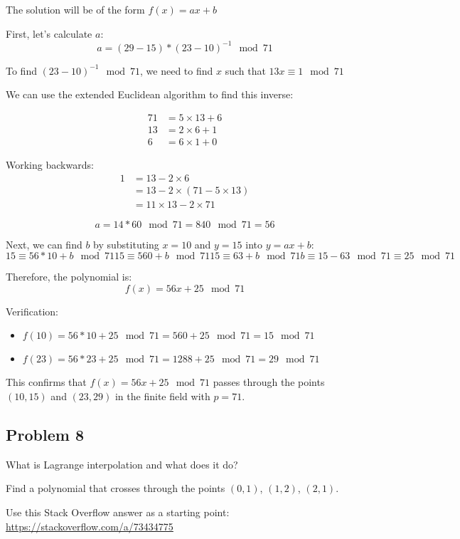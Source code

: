 \documentclass{article}
\begin{document}
The solution will be of the form $f(x) = ax + b$

First, let's calculate $a$:
\[
a = (29-15) * (23-10)^{-1} \mod 71
\]

To find $(23-10)^{-1} \mod 71$, we need to find $x$ such that $13x \equiv 1 \mod 71$

We can use the extended Euclidean algorithm to find this inverse:

\begin{align*}
71 &= 5 \times 13 + 6 \\
13 &= 2 \times 6 + 1 \\
6 &= 6 \times 1 + 0
\end{align*}

Working backwards:
\begin{align*}
1 &= 13 - 2 \times 6 \\
  &= 13 - 2 \times (71 - 5 \times 13) \\
  &= 11 \times 13 - 2 \times 71
\end{align*}

\[
a = 14 * 60 \mod 71 = 840 \mod 71 = 56
\]

Next, we can find $b$ by substituting $x=10$ and $y=15$ into $y = ax + b$:
\[
15 \equiv 56 * 10 + b \mod 71
15 \equiv 560 + b \mod 71
15 \equiv 63 + b \mod 71
b \equiv 15 - 63 \mod 71 \equiv 25 \mod 71
\]

Therefore, the polynomial is:
\[
f(x) = 56x + 25 \mod 71
\]

Verification:
\begin{itemize}
    \item $f(10) = 56 * 10 + 25 \mod 71 = 560 + 25 \mod 71 = 15 \mod 71$
    \item $f(23) = 56 * 23 + 25 \mod 71 = 1288 + 25 \mod 71 = 29 \mod 71$
\end{itemize}

This confirms that $f(x) = 56x + 25 \mod 71$ passes through the points $(10, 15)$ and $(23, 29)$ in the finite field with $p=71$.

\subsection*{Problem 8}
What is Lagrange interpolation and what does it do?

Find a polynomial that crosses through the points $(0, 1)$, $(1, 2)$, $(2, 1)$.

Use this Stack Overflow answer as a starting point: \url{https://stackoverflow.com/a/73434775}
\end{document}
